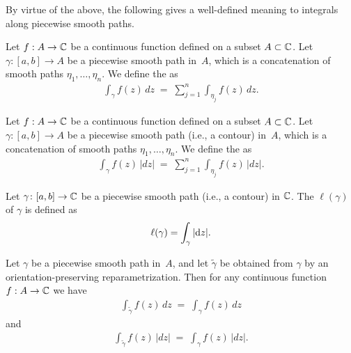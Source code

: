 By virtue of the above, the following gives a well-defined meaning
to integrals along piecewise smooth paths.
\begin{definition}
  \label{def:contour_integral}
  Let $f : A \to \mathbb{C}$ be a continuous function defined on a subset $A \subset \mathbb{C}$.
  Let $\gamma \colon [a,b] \to A$ be a piecewise smooth path in~$A$,
  which is a concatenation of smooth paths $\eta_1, \ldots, \eta_n$.
  We define the  as
  \begin{align*}
    \int_\gamma f(z) \, dz \; = \; \sum_{j=1}^n \int_{\eta_j} f(z) \, dz .
  \end{align*}
\end{definition}

\begin{definition}
  \label{def:arc_length_integral}
  Let $f : A \to \mathbb{C}$ be a continuous function defined on a subset $A \subset \mathbb{C}$.
  Let $\gamma \colon [a,b] \to A$ be a piecewise smooth path (i.e., a contour) in~$A$,
  which is a concatenation of smooth paths $\eta_1, \ldots, \eta_n$.
  We define the  as
  \begin{align*}
    \int_\gamma f(z) \, |dz| \; = \; \sum_{j=1}^n \int_{\eta_j} f(z) \, |dz| .
  \end{align*}
\end{definition}

\begin{definition}
  \label{def:length}
  Let $\gamma \colon [a,b] \to \mathbb{C}$ be a piecewise smooth path (i.e., a contour)
  in $\mathbb{C}$. The  $\ell(\gamma)$ of $\gamma$ is defined as
  \begin{align*}
    \ell(\gamma) = \int_\gamma |\mathrm{d} z| .
  \end{align*}
\end{definition}

\begin{lemma}
  \label{lem:reparametrization_invariance_of_integral}
  Let $\gamma$ be a piecewise smooth path in~$A$,
  and let $\widetilde{\gamma}$ be obtained from $\gamma$ by an
  orientation-preserving reparametrization. Then for any continuous
  function $f : A \to \mathbb{C}$ we have
  \begin{align*}
    \int_{\widetilde{\gamma}} f(z) \, dz \; = \; \int_{\gamma} f(z) \, dz
  \end{align*}
  and
  \begin{align*}
    \int_{\widetilde{\gamma}} f(z) \, |dz| \; = \; \int_{\gamma} f(z) \, |dz| .
  \end{align*}
\end{lemma}

